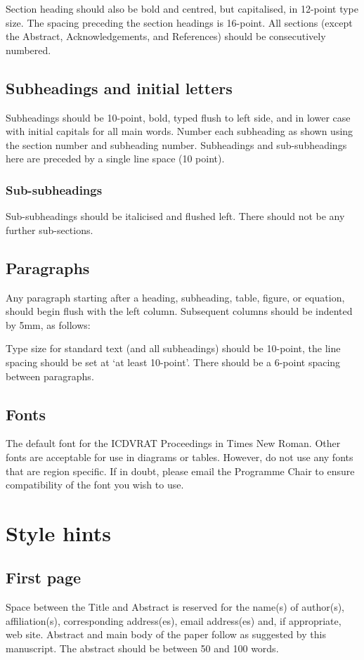 \documentclass[A4,10pt,twoside]{article}
\begin{document}
Section heading should also be bold and centred, but capitalised, in 12-point type size. The spacing preceding the section headings is 16-point. All sections (except the Abstract, Acknowledgements, and References) should be consecutively numbered.

\subsection{Subheadings and initial letters}
Subheadings should be 10-point, bold, typed flush to left side, and in lower case with initial capitals for all main words. Number each subheading as shown using the section number and subheading number. Subheadings and sub-subheadings here are preceded by a single line space (10 point).

\subsubsection{Sub-subheadings}
Sub-subheadings should be italicised and flushed left. There should not be any further sub-sections.

\subsection{Paragraphs}
Any paragraph starting after a heading, subheading, table, figure, or equation, should begin flush with the left column. Subsequent columns should be indented by 5mm, as follows:
\vspace{10pt}

Type size for standard text (and all subheadings) should be 10-point, the line spacing should be set at ‘at least 10-point’. There should be a 6-point spacing between paragraphs.	

\subsection{Fonts}
The default font for the ICDVRAT Proceedings in Times New Roman. Other fonts are acceptable for use in diagrams or tables. However, do not use any fonts that are region specific. If in doubt, please email the Programme Chair to ensure compatibility of the font you wish to use.

\section{Style hints}

\subsection{First page}
Space between the Title and Abstract is reserved for the name(s) of author(s), affiliation(s), corresponding address(es), email address(es) and, if appropriate, web site. Abstract and main body of the paper follow as suggested by this manuscript. The abstract should be between 50 and 100 words.	
\end{document}
